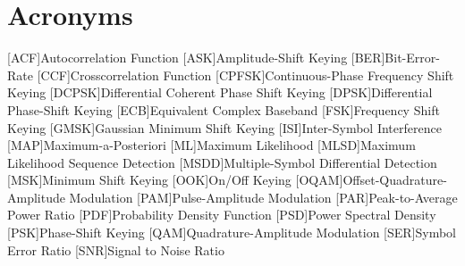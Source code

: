 \chapter{Acronyms}
\begin{acronym}[DCPSK]
    [ACF]{Autocorrelation Function}
    [ASK]{Amplitude-Shift Keying}
    [BER]{Bit-Error-Rate}
    [CCF]{Crosscorrelation Function}
    [CPFSK]{Continuous-Phase Frequency Shift Keying}
    [DCPSK]{Differential Coherent Phase Shift Keying}
    [DPSK]{Differential Phase-Shift Keying}
    [ECB]{Equivalent Complex Baseband}
    [FSK]{Frequency Shift Keying}
    [GMSK]{Gaussian Minimum Shift Keying}
    [ISI]{Inter-Symbol Interference}
    [MAP]{Maximum-a-Posteriori}
    [ML]{Maximum Likelihood}
    [MLSD]{Maximum Likelihood Sequence Detection}
    [MSDD]{Multiple-Symbol Differential Detection}
    [MSK]{Minimum Shift Keying}
    [OOK]{On/Off Keying}
    [OQAM]{Offset-Quadrature-Amplitude Modulation}
    [PAM]{Pulse-Amplitude Modulation}
    [PAR]{Peak-to-Average Power Ratio}
    [PDF]{Probability Density Function}
    [PSD]{Power Spectral Density}
    [PSK]{Phase-Shift Keying}
    [QAM]{Quadrature-Amplitude Modulation}
    [SER]{Symbol Error Ratio}
    [SNR]{Signal to Noise Ratio}
\end{acronym}
